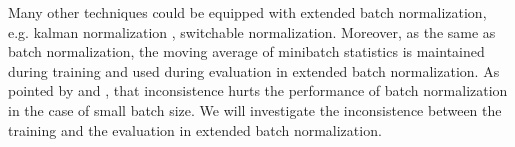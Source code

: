 \documentclass[runningheads]{llncs}
\begin{document}
Many other techniques could be equipped with extended batch normalization, e.g. kalman normalization \cite{wang2018kalman}, switchable normalization\cite{luo2018differentiable}.  
Moreover, as the same as batch normalization, the moving average of minibatch statistics is maintained during training and used during evaluation in extended batch normalization.  
As pointed by \cite{ioffe2017batch} and \cite{singh2019evalnorm}, that inconsistence hurts the performance of batch normalization in the case of small batch size. We will investigate the inconsistence between the training and the evaluation in extended batch normalization.

\clearpage


\end{document}
